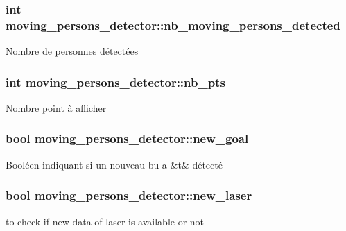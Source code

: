 \subsubsection[{\texorpdfstring{nb\+\_\+moving\+\_\+persons\+\_\+detected}{nb_moving_persons_detected}}]{\setlength{\rightskip}{0pt plus 5cm}int moving\+\_\+persons\+\_\+detector\+::nb\+\_\+moving\+\_\+persons\+\_\+detected\hspace{0.3cm}{\ttfamily [private]}}\hypertarget{classmoving__persons__detector_a7f2bae601889ce3c935ae218814e6be9}{}\label{classmoving__persons__detector_a7f2bae601889ce3c935ae218814e6be9}
Nombre de personnes détectées 
\subsubsection[{\texorpdfstring{nb\+\_\+pts}{nb_pts}}]{\setlength{\rightskip}{0pt plus 5cm}int moving\+\_\+persons\+\_\+detector\+::nb\+\_\+pts\hspace{0.3cm}{\ttfamily [private]}}\hypertarget{classmoving__persons__detector_a207858cf1fc0675c38eb41a5d8edf245}{}\label{classmoving__persons__detector_a207858cf1fc0675c38eb41a5d8edf245}
Nombre point à afficher 
\subsubsection[{\texorpdfstring{new\+\_\+goal}{new_goal}}]{\setlength{\rightskip}{0pt plus 5cm}bool moving\+\_\+persons\+\_\+detector\+::new\+\_\+goal\hspace{0.3cm}{\ttfamily [private]}}\hypertarget{classmoving__persons__detector_a49ade373e545c987b519a7c2e686820c}{}\label{classmoving__persons__detector_a49ade373e545c987b519a7c2e686820c}
Booléen indiquant si un nouveau bu a \&t\& détecté 
\subsubsection[{\texorpdfstring{new\+\_\+laser}{new_laser}}]{\setlength{\rightskip}{0pt plus 5cm}bool moving\+\_\+persons\+\_\+detector\+::new\+\_\+laser\hspace{0.3cm}{\ttfamily [private]}}\hypertarget{classmoving__persons__detector_a379e4d7d62fc6b2a163464b728177463}{}\label{classmoving__persons__detector_a379e4d7d62fc6b2a163464b728177463}
to check if new data of laser is available or not 
